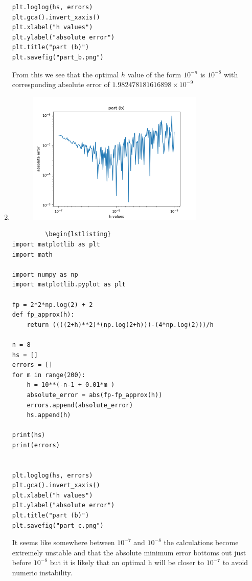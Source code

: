 \documentclass{amsart}
\begin{document}
\begin{enumerate}[label = (\alph*)]
\begin{lstlisting}
plt.loglog(hs, errors)
plt.gca().invert_xaxis()
plt.xlabel("h values")
plt.ylabel("absolute error")
plt.title("part (b)")
plt.savefig("part_b.png")
         \end{lstlisting}
         From this we see that the optimal $h$ value of the form  $10^{-n}$ is $10^{-8}$ with corresponding absolute
         error of $1.982478181616898 \times 10^{-9}$
     \item 
         \begin{figure}[h]
             \centering
             \includegraphics[width=0.8\textwidth]{part_c.png}
         \end{figure}
         \begin{lstlisting}
         \begin{lstlisting}
import matplotlib as plt
import math

import numpy as np
import matplotlib.pyplot as plt

fp = 2*2*np.log(2) + 2
def fp_approx(h):
    return ((((2+h)**2)*(np.log(2+h)))-(4*np.log(2)))/h

n = 8
hs = []
errors = []
for m in range(200):
    h = 10**(-n-1 + 0.01*m )
    absolute_error = abs(fp-fp_approx(h))
    errors.append(absolute_error)
    hs.append(h)

print(hs)
print(errors)


plt.loglog(hs, errors)
plt.gca().invert_xaxis()
plt.xlabel("h values")
plt.ylabel("absolute error")
plt.title("part (b)")
plt.savefig("part_c.png")

         \end{lstlisting}
         It seems like somewhere between $10^{-7}$ and $10^{-8}$ the calculations become extremely
         unstable and that the absolute minimum error bottoms out just before $10^{-8}$ but it is likely
         that an optimal h will be closer to $10^{-7}$ to avoid numeric instability.
     \end{enumerate}
\end{document}
